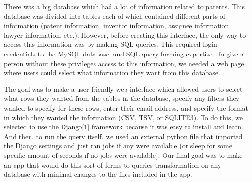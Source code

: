 There was a big database which had a lot of information related to patents. This database was divided into tables each of which contained different parts of information (patent information, inventor information, assignee information, lawyer information, etc.). However, before creating this interface, the only way to access this information was by making SQL queries. This required login credentials to the MySQL database, and SQL query forming expertise. To give a person without these privileges access to this information, we needed a web page where users could select what information they want from this database.

	The goal was to make a user friendly web interface which allowed users to select what rows they wanted from the tables in the database, specify any filters they wanted to specify for these rows, enter their email address, and specify the format in which they wanted the information (CSV, TSV, or SQLITE3). To do this, we selected to use the Django[1] framework because it was easy to install and learn. And then, to run the query itself, we used an external python file that imported the Django settings and just ran jobs if any were available (or sleep for some specific amount of seconds if no jobs were available). Our final goal was to make an app that would do this sort of forms to queries transformation on any database with minimal changes to the files included in the app. 